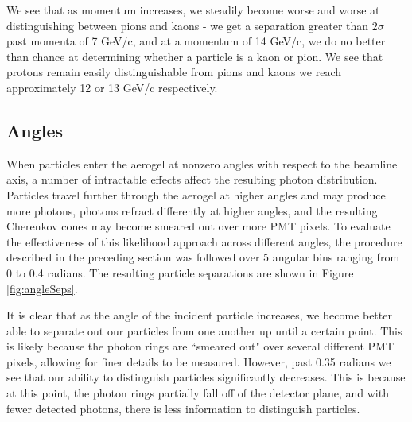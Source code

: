 \begin{figure}[]
\centering
{}
\caption[\TODO{}]{}
\label{fig:centeredMis} 
\end{figure}

We see that as momentum increases, we steadily become worse and worse at distinguishing between pions and kaons - we get a separation greater than $2 \sigma$ past momenta of 7 GeV/c, and at a momentum of 14 GeV/c, we do no better than chance at determining whether a particle is a kaon or pion.
We see that protons remain easily distinguishable from pions and kaons we reach approximately 12 or 13 GeV/c respectively. 

\subsection{Angles}
When particles enter the aerogel at nonzero angles with respect to the beamline axis, a number of intractable effects affect the resulting photon distribution. 
Particles travel further through the aerogel at higher angles and may produce more photons, photons refract differently at higher angles, and the resulting Cherenkov cones may become smeared out over more PMT pixels. 
To evaluate the effectiveness of this likelihood approach across different angles, the procedure described in the preceding section was followed over 5 angular bins ranging from 0 to 0.4 radians.
The resulting particle separations are shown in Figure \ref{fig:angleSeps}.

It is clear that as the angle of the incident particle increases, we become better able to separate out our particles from one another up until a certain point.
This is likely because the photon rings are ``smeared out" over several different PMT pixels, allowing for finer details to be measured. 
However, past 0.35 radians we see that our ability to distinguish particles significantly decreases.
This is because at this point, the photon rings partially fall off of the detector plane, and with fewer detected photons, there is less information to distinguish particles.

